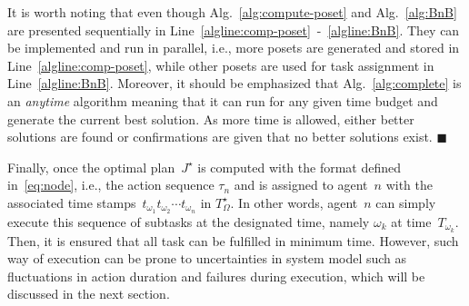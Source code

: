 \begin{remark}\label{remark:parallel}
It is worth noting that even though Alg.~\ref{alg:compute-poset} and
Alg.~\ref{alg:BnB} are presented sequentially in
Line~\ref{algline:comp-poset}~-~\ref{algline:BnB}.
They can be implemented and run {in parallel}, i.e., more posets are
generated and stored in Line~\ref{algline:comp-poset},
while other posets are used for task assignment in Line~\ref{algline:BnB}.
Moreover, it should be emphasized that Alg.~\ref{alg:complete} is an \emph{anytime}
algorithm meaning that it can run for any given time budget and generate the
current best solution.
As more time is allowed, either better solutions are found or confirmations are
given that no better solutions exist.
\hfill  $\blacksquare$
\end{remark}




Finally, once the optimal plan~$J^\star$ is computed with the format
defined in~\eqref{eq:node}, i.e.,
the action sequence $\tau_n$ and is assigned
to agent~$n$ with the associated time stamps~$t_{\omega_1}t_{\omega_2}\cdots t_{\omega_n}$ in $T^\star_\Omega$.
In other words,
agent~$n$ can simply execute this sequence of subtasks at the designated time,
namely $\omega_k$ at time~$T_{\omega_k}$.
Then, it is ensured that all task can be fulfilled in minimum time.
However, such way of execution can be prone to uncertainties in system model
such as fluctuations in action duration
and failures during execution, which will be discussed in the next section.
